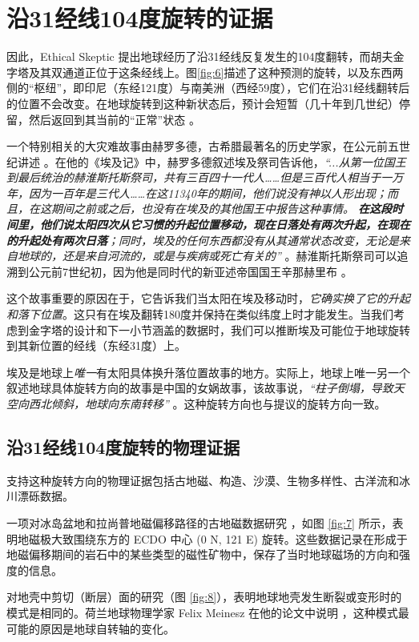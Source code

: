 \documentclass[10pt,twocolumn,letterpaper]{article}
\begin{document}
\section{沿31经线104度旋转的证据}

因此，Ethical Skeptic 提出地球经历了沿31经线反复发生的104度翻转，而胡夫金字塔及其双通道正位于这条经线上。图\ref{fig:6}描述了这种预测的旋转，以及东西两侧的“枢纽”，即印尼（东经121度）与南美洲（西经59度），它们在沿31经线翻转后的位置不会改变。在地球旋转到这种新状态后，预计会短暂（几十年到几世纪）停留，然后返回到其当前的“正常”状态 \cite{150}。

一个特别相关的大灾难故事由赫罗多德，古希腊最著名的历史学家，在公元前五世纪讲述 \cite{31}。在他的《埃及记》中，赫罗多德叙述埃及祭司告诉他，\textit{“...从第一位国王到最后统治的赫淮斯托斯祭司，共有三百四十一代人……但是三百代人相当于一万年，因为一百年是三代人……在这11340年的期间，他们说没有神以人形出现；而且，在这期间之前或之后，也没有在埃及的其他国王中报告这种事情。 \textbf{在这段时间里，他们说太阳四次从它习惯的升起位置移动，现在日落处有两次升起，在现在的升起处有两次日落}；同时，埃及的任何东西都没有从其通常状态改变，无论是来自地球的，还是来自河流的，或是与疾病或死亡有关的”} \cite{32}。赫淮斯托斯祭司可以追溯到公元前7世纪初，因为他是同时代的新亚述帝国国王辛那赫里布 \cite{32,33,34}。

这个故事重要的原因在于，它告诉我们当太阳在埃及移动时，\textit{它确实换了它的升起和落下位置}。这只有在埃及翻转180度并保持在类似纬度上时才能发生。当我们考虑到金字塔的设计和下一小节涵盖的数据时，我们可以推断埃及可能位于地球旋转到其新位置的经线（东经31度）上。

埃及是地球上\textit{唯一}有太阳具体换升落位置故事的地方。实际上，地球上唯一另一个叙述地球具体旋转方向的故事是中国的女娲故事，该故事说，\textit{“柱子倒塌，导致天空向西北倾斜，地球向东南转移”} \cite{8}。这种旋转方向也与提议的旋转方向一致。

\subsection{沿31经线104度旋转的物理证据}

支持这种旋转方向的物理证据包括古地磁、构造、沙漠、生物多样性、古洋流和冰川漂砾数据。

一项对冰岛盆地和拉尚普地磁偏移路径的古地磁数据研究 \cite{35}，如图 \ref{fig:7} 所示，表明地磁极大致围绕东方的 ECDO 中心 (0 N, 121 E) 旋转。这些数据记录在形成于地磁偏移期间的岩石中的某些类型的磁性矿物中，保存了当时地球磁场的方向和强度的信息。

对地壳中剪切（断层）面的研究（图 \ref{fig:8}），表明地球地壳发生断裂或变形时的模式是相同的。荷兰地球物理学家 Felix Meinesz 在他的论文中说明 \cite{36}，这种模式最可能的原因是地球自转轴的变化。
\end{document}
